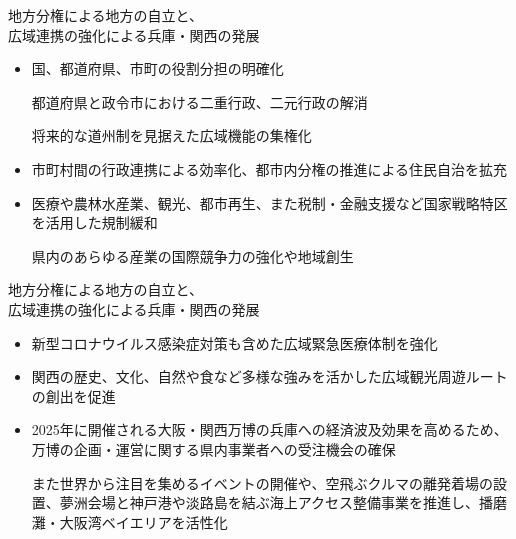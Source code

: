 \documentclass[dvipdfmx]{beamer}
\begin{document}
    \begin{frame}{地方分権による地方の自立と、\\広域連携の強化による兵庫・関西の発展}{}
        \begin{small}
            \begin{itemize}
                \setlength{\parsep}{.5mm}
                \setlength{\itemsep}{2mm}
                \item 国、都道府県、市町の役割分担の明確化\par
                都道府県と政令市における二重行政、二元行政の解消\par
                将来的な道州制を見据えた広域機能の集権化
                \item 市町村間の行政連携による効率化、都市内分権の推進による住民自治を拡充
                \item 医療や農林水産業、観光、都市再生、また税制・金融支援など国家戦略特区を活用した規制緩和\par
                県内のあらゆる産業の国際競争力の強化や地域創生
            \end{itemize}
        \end{small}
    \end{frame}

    \begin{frame}{地方分権による地方の自立と、\\広域連携の強化による兵庫・関西の発展}{}
        \begin{small}
            \begin{itemize}
                \setlength{\parsep}{.5mm}
                \setlength{\itemsep}{2mm}
                \item 新型コロナウイルス感染症対策も含めた広域緊急医療体制を強化
                \item 関西の歴史、文化、自然や食など多様な強みを活かした広域観光周遊ルートの創出を促進
                \item 2025年に開催される大阪・関西万博の兵庫への経済波及効果を高めるため、万博の企画・運営に関する県内事業者への受注機会の確保\par
                また世界から注目を集めるイベントの開催や、空飛ぶクルマの離発着場の設置、夢洲会場と神戸港や淡路島を結ぶ海上アクセス整備事業を推進し、播磨灘・大阪湾ベイエリアを活性化
            \end{itemize}
        \end{small}
    \end{frame}
\end{document}
